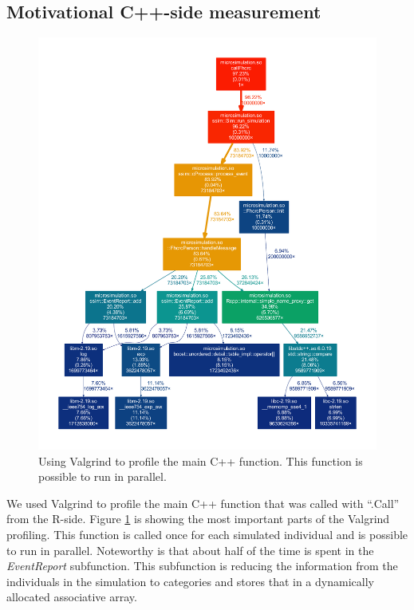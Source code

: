 \subsection{Motivational C++-side measurement}
\begin{figure}[!htbp] \centering
  \includegraphics[height=0.70\textheight]{images/simpleMotivatingValgrind.pdf}
  \caption{Using Valgrind to profile the main C++ function. This
    function is possible to run in parallel.}
  \label{fig:cppMot}
\end{figure}

We used Valgrind to profile the main C++ function that was called with
``.Call'' from the R-side. Figure \ref{fig:cppMot} is showing the most
important parts of the Valgrind profiling. This function is called
once for each simulated individual and is possible to run in
parallel. Noteworthy is that about half of the time is spent in the
\emph{EventReport} subfunction. This subfunction is reducing the
information from the individuals in the simulation to categories and
stores that in a dynamically allocated associative array.




